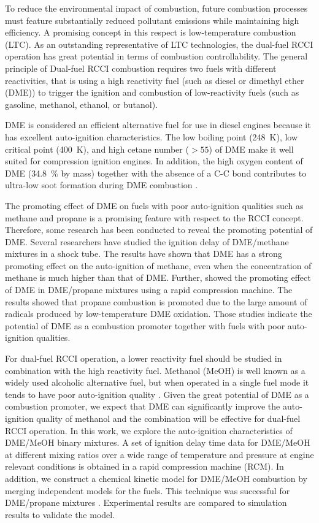 \documentclass[12pt]{../ussci}
\begin{document}
To reduce the environmental impact of combustion, future combustion processes
must feature substantially reduced pollutant emissions while maintaining high
efficiency. A promising concept in this respect is low-temperature combustion
(LTC). As an outstanding representative of LTC technologies, the dual-fuel RCCI
operation has great potential in terms of combustion controllability. The
general principle of Dual-fuel RCCI combustion requires two fuels with different
reactivities, that is using a high reactivity fuel (such as diesel or dimethyl
ether (DME)) to trigger the ignition and combustion of low-reactivity fuels
(such as gasoline, methanol, ethanol, or butanol).

DME is considered an efficient alternative fuel for use in diesel engines
because it has excellent auto-ignition characteristics. The low boiling point
(\SI{248}{\K}), low critical point (\SI{400}{\K}), and high cetane number (\(>
55\)) of DME \autocite{Arcoumanis2008,Teng2001} make it well suited for
compression ignition engines. In addition, the high oxygen content of DME
(\SI{34.8}{\percent} by mass) together with the absence of a C-C bond
contributes to ultra-low soot formation during DME combustion
\autocite{Arcoumanis2008}.

The promoting effect of DME on fuels with poor auto-ignition qualities such as
methane and propane is a promising feature with respect to the RCCI concept.
Therefore, some research has been conducted to reveal the promoting potential of
DME. Several researchers \autocite{Burke2015a,Tang2012a,Chen2007a} have studied
the ignition delay of DME/methane mixtures in a shock tube. The results have
shown that DME has a strong promoting effect on the auto-ignition of methane,
even when the concentration of methane is much higher than that of DME. Further,
\textcite{Dames2016} showed the promoting effect of DME in DME/propane mixtures
using a rapid compression machine. The results showed that propane combustion is
promoted due to the large amount of radicals produced by low-temperature DME
oxidation. Those studies indicate the potential of DME as a combustion promoter
together with fuels with poor auto-ignition qualities.

For dual-fuel RCCI operation, a lower reactivity fuel should be studied in
combination with the high reactivity fuel. Methanol (MeOH) is well known as a
widely used alcoholic alternative fuel, but when operated in a single fuel mode
it tends to have poor auto-ignition quality \autocite{Siebers1987}. Given the
great potential of DME as a combustion promoter, we expect that DME can
significantly improve the auto-ignition quality of methanol and the combination
will be effective for dual-fuel RCCI operation. In this work, we explore the
auto-ignition characteristics of DME/MeOH binary mixtures. A set of ignition
delay time data for DME/MeOH at different mixing ratios over a wide range of
temperature and pressure at engine relevant conditions is obtained in a rapid
compression machine (RCM). In addition, we construct a chemical kinetic model
for DME/MeOH combustion by merging independent models for the fuels. This
technique was successful for DME/propane mixtures \autocite{Dames2016}.
Experimental results are compared to simulation results to validate the model.
\end{document}
